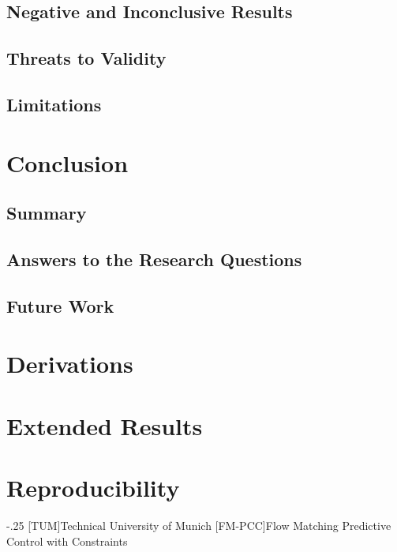 \documentclass[headsepline,footsepline,footinclude=false,oneside,fontsize=11pt,paper=a4,listof=totoc,bibliography=totoc]{scrbook}
\newcommand{\printbibliography}{}
\begin{document}
\section{Negative and Inconclusive Results}
\section{Threats to Validity}
\section{Limitations}

\chapter{Conclusion}\label{ch:conclusion}
\section{Summary}
\section{Answers to the Research Questions}
\section{Future Work}

\appendix{}

\chapter{Derivations}\label{app:derivations}
\chapter{Extended Results}\label{app:results}
\chapter{Reproducibility}\label{app:repro}


\begin{acronym}
  \itemsep-.25\baselineskip
  [TUM]{Technical University of Munich}
  [FM-PCC]{Flow Matching Predictive Control with Constraints}
\end{acronym}

\listoffigures{}
\listoftables{}
\printbibliography{}
\end{document}

